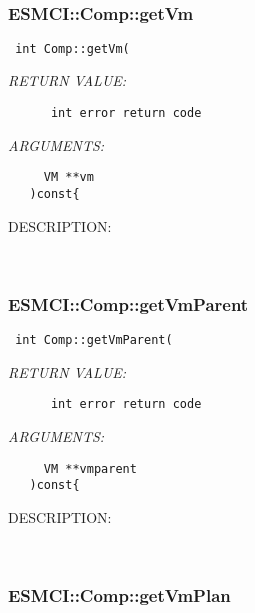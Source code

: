    
 
\mbox{}\hrulefill\
 
\subsubsection [ESMCI::Comp::getVm] {ESMCI::Comp::getVm}


  
\begin{verbatim} int Comp::getVm(\end{verbatim}{\em RETURN VALUE:}
\begin{verbatim}      int error return code\end{verbatim}{\em ARGUMENTS:}
\begin{verbatim}     VM **vm
   )const{\end{verbatim}
{\sf DESCRIPTION:\\ }


   
 
\mbox{}\hrulefill\
 
\subsubsection [ESMCI::Comp::getVmParent] {ESMCI::Comp::getVmParent}


  
\begin{verbatim} int Comp::getVmParent(\end{verbatim}{\em RETURN VALUE:}
\begin{verbatim}      int error return code\end{verbatim}{\em ARGUMENTS:}
\begin{verbatim}     VM **vmparent
   )const{\end{verbatim}
{\sf DESCRIPTION:\\ }


   
 
\mbox{}\hrulefill\
 
\subsubsection [ESMCI::Comp::getVmPlan] {ESMCI::Comp::getVmPlan}


